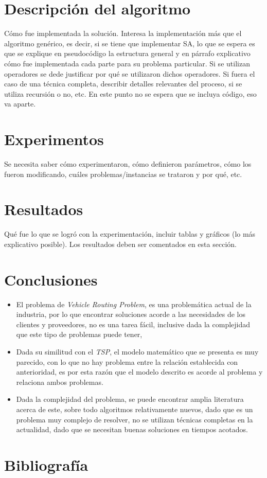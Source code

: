 \documentclass[letter, 10pt]{article}
\begin{document}
\section{Descripci\'on del algoritmo}
C\'omo fue implementada la soluci\'on. Interesa la implementaci\'on m\'as que el algoritmo gen\'erico, es decir,
si se tiene que implementar SA, lo que se espera es que se explique en pseudoc\'odigo la estructura
general y en p\'arrafo explicativo c\'omo fue implementada cada parte para su problema particular. Si
se utilizan operadores se dede justificar por qu\'e se utilizaron dichos operadores. Si fuera el caso de una
t\'ecnica completa, describir detalles relevantes del proceso, si se utiliza recursi\'on o no, etc.
En este punto no se espera que se incluya c\'odigo, eso va aparte.

\section{Experimentos}
Se necesita saber c\'omo experimentaron, c\'omo definieron par\'ametros, c\'omo los fueron modificando, cu\'ales 
problemas/instancias se trataron y por qu\'e, etc.

\section{Resultados}
Qu\'e fue lo que se logr\'o con la experimentaci\'on, incluir tablas y gr\'aficos (lo m\'as explicativo posible).
Los resultados deben ser comentados en esta secci\'on.

\newpage
\section{Conclusiones}
\begin{itemize}
 \item El problema de \emph{Vehicle Routing Problem}, es una problem\'atica actual de la industria, por lo que encontrar soluciones acorde 
 a las necesidades de los clientes y proveedores, no es una tarea f\'acil, inclusive dada la complejidad que este tipo de problemas puede tener,
 \item Dada su similitud con el \emph{TSP}, el modelo matem\'atico que se presenta es muy parecido, con lo que no hay problema entre la 
 relaci\'on establecida con anterioridad, es por esta raz\'on que el modelo descrito es acorde al problema y relaciona ambos problemas.
 \item Dada la complejidad del problema, se puede encontrar amplia literatura acerca de este, sobre todo algoritmos relativamente nuevos, dado que
 es un problema muy complejo de resolver, no se utilizan t\'ecnicas completas en la actualidad, dado que se necesitan buenas soluciones en tiempos 
 acotados.
 \end{itemize}

\newpage
\section{Bibliograf\'ia}


\end{document}
